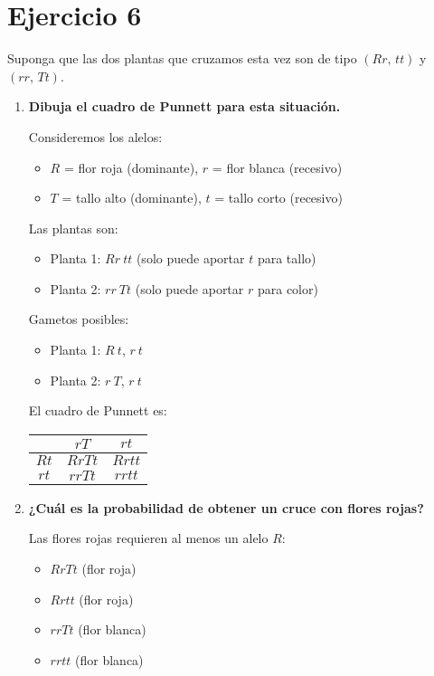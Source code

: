 \documentclass{article}
\begin{document}
\section*{Ejercicio 6}

Suponga que las dos plantas que cruzamos esta vez son de tipo $(Rr,\, tt)$ y $(rr,\, Tt)$.

\begin{enumerate}[label=\alph*)]
    \item \textbf{Dibuja el cuadro de Punnett para esta situación.}

    Consideremos los alelos:
    \begin{itemize}
        \item $R$ = flor roja (dominante), $r$ = flor blanca (recesivo)
        \item $T$ = tallo alto (dominante), $t$ = tallo corto (recesivo)
    \end{itemize}

    Las plantas son:
    \begin{itemize}
        \item Planta 1: $Rr\ tt$ (solo puede aportar $t$ para tallo)
        \item Planta 2: $rr\ Tt$ (solo puede aportar $r$ para color)
    \end{itemize}

    Gametos posibles:
    \begin{itemize}
        \item Planta 1: $R\ t$, $r\ t$
        \item Planta 2: $r\ T$, $r\ t$
    \end{itemize}

    El cuadro de Punnett es:

    \begin{center}
    \begin{tabular}{c|cc}
         & $rT$ & $rt$ \\
        \hline
        $Rt$ & $RrTt$ & $Rrtt$ \\
        $rt$ & $rrTt$ & $rrtt$ \\
    \end{tabular}
    \end{center}

    \item \textbf{¿Cuál es la probabilidad de obtener un cruce con flores rojas?}

    Las flores rojas requieren al menos un alelo $R$:
    \begin{itemize}
        \item $RrTt$ (flor roja)
        \item $Rrtt$ (flor roja)
        \item $rrTt$ (flor blanca)
        \item $rrtt$ (flor blanca)
    \end{itemize}


\end{enumerate}
\end{document}
